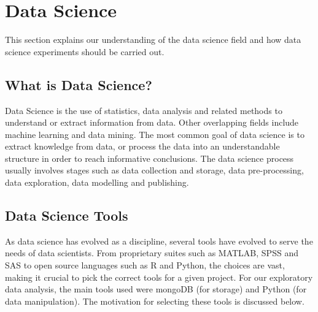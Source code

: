 \documentclass[fleqn,10pt]{SelfArx} %
\begin{document}

\section{Data Science}
This section explains our understanding of the data science field and how data science experiments should be carried out. 

	\subsection{What is Data Science?}
Data Science is the use of statistics, data analysis and related methods to understand or extract information from data. Other overlapping fields include machine learning and data mining. The most common goal of data science is to extract knowledge from data, or process the data into an understandable structure in order to reach informative conclusions. The data science process usually involves stages such as data collection and storage, data pre-processing, data exploration, data modelling and publishing. \\

	\subsection{Data Science Tools}
As data science has evolved as a discipline, several tools have evolved to serve the needs of data scientists. From proprietary suites such as MATLAB, SPSS and SAS to open source languages such as R and Python, the choices are vast, making it crucial to pick the correct tools for a given project. For our exploratory data analysis, the main tools used were mongoDB (for storage) and Python (for data manipulation). The motivation for selecting these tools is discussed below. \\
\end{document}
